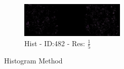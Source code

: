 \documentclass[a4paper,10pt,oneside]{article}
\begin{document}
\begin{figure}[hbtp]
\begin{subfigure}[b]{5cm}
    \includegraphics[width=5cm]{visualization/results/histogramSeg/res_reduce_5/Region_1_PO14-00482B3_1_2_201404171123.png}
    \caption{Hist - ID:482 - Res: $\frac{1}{5}$}
  \end{subfigure}
  \caption{Histogram Method}
\end{figure}
\end{document}
